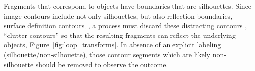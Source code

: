 


Fragments that correspond to objects have boundaries that are silhouettes. Since image contours include not only silhouettes, but also reflection boundaries, surface definition contours, \etc, a process must discard these distracting contours \ie, ``clutter contours'' so that the resulting fragments can reflect the underlying objects, Figure~\ref{fig:loop_transforms}. In absence of an explicit labeling (silhouette/non-silhouette), those contour segments which are likely non-silhouette should be removed to observe the outcome. 


